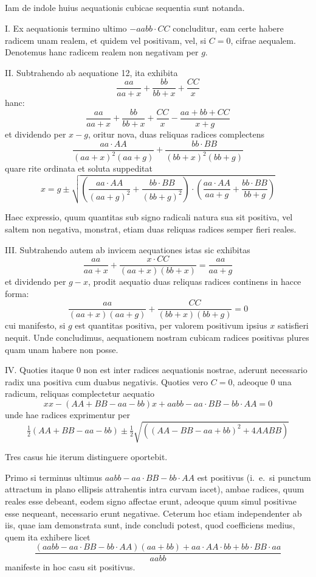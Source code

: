 \documentclass[12pt,a4paper]{article}
\begin{document}
\setcounter{subsection}{5}
\subsection{}

Iam de indole huius aequationis cubicae sequentia sunt notanda.

\textsc{I.} Ex aequationis termino ultimo $-aabb\cdot CC$ concluditur, eam certe habere radicem unam realem, et quidem vel positivam, vel, si $C=0$, cifrae aequalem. Denotemus hanc radicem realem non negativam per $g$.

\textsc{II.} Subtrahendo ab aequatione 12, ita exhibita
\[
\frac{aa}{aa+x} + \frac{bb}{bb+x} + \frac{CC}{x}
\]
hanc:
\[
\frac{aa}{aa+x} + \frac{bb}{bb+x} + \frac{CC}{x} - \frac{aa+bb+CC}{x+g}
\]
et dividendo per $x-g$, oritur nova, duas reliquas radices complectens
\[
\frac{aa\cdot AA}{(aa+x)^2(aa+g)} + \frac{bb\cdot BB}{(bb+x)^2(bb+g)}
\]
quare rite ordinata et soluta suppeditat
\[
x = g \pm \sqrt{\left(\frac{aa\cdot AA}{(aa+g)^2} + \frac{bb\cdot BB}{(bb+g)^2}\right) \cdot
\left(\frac{aa\cdot AA}{aa+g} + \frac{bb\cdot BB}{bb+g}\right)}
\tag{14}
\]

Haec expressio, quum quantitas sub signo radicali natura sua sit positiva, vel saltem non negativa, monstrat, etiam duas reliquas radices semper fieri reales.

\textsc{III.} Subtrahendo autem ab invicem aequationes istas sic exhibitas
\[
\frac{aa}{aa+x} + \frac{x\cdot CC}{(aa+x)(bb+x)} = \frac{aa}{aa+g}
\]
et dividendo per $g-x$, prodit aequatio duas reliquas radices continens in hacce forma:
\[
\frac{aa}{(aa+x)(aa+g)} + \frac{CC}{(bb+x)(bb+g)} = 0
\]
cui manifesto, si $g$ est quantitas positiva, per valorem positivum ipsius $x$ satisfieri nequit. Unde concludimus, aequationem nostram cubicam radices positivas plures quam unam habere non posse.

\textsc{IV.} Quoties itaque $0$ non est inter radices aequationis nostrae, aderunt necessario radix una positiva cum duabus negativis. Quoties vero $C=0$, adeoque $0$ una radicum, reliquas complectetur aequatio
\[
xx - (AA+BB-aa-bb)x + aabb - aa\cdot BB - bb\cdot AA = 0
\]
unde hae radices exprimentur per
\[
\tfrac{1}{2}(AA+BB-aa-bb) \pm \tfrac{1}{2}\sqrt{((AA-BB-aa+bb)^2 + 4AABB)}
\]

Tres casus hie iterum distinguere oportebit.

Primo si terminus ultimus $aabb - aa\cdot BB - bb\cdot AA$ est positivus (i.~e.\ si punctum attractum in plano ellipsis attrahentis intra curvam iacet), ambae radices, quum reales esse debeant, eodem signo affectae erunt, adeoque quum simul positivae esse nequeant, necessario erunt negativae. Ceterum hoc etiam independenter ab iis, quae iam demonstrata sunt, inde concludi potest, quod coefficiens medius, quem ita exhibere licet
\[
\frac{(aabb - aa\cdot BB - bb\cdot AA)(aa+bb) + aa\cdot AA\cdot bb + bb\cdot BB\cdot aa}{aabb}
\]
manifeste in hoc casu sit positivus.
\end{document}
